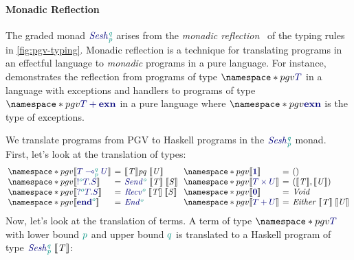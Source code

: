 \documentclass[sigplan,screen]{acmart}
\newcommand{\Conid}[1]{\mathit{#1}}
\newcommand{\Varid}[1]{\mathit{#1}}
\newcommand*\hsUnrestrictedArrow[3]{#1}
\newcommand*\hsLinearArrow[3]{#2\global\let\hsArrow=\hsUnrestrictedArrow}
\newcommand\hsPercent{%
  \global\let\hsOne=\hsOneAfterPercentCmd}
\newcommand*\hsOneAfterPercentCmd{%
  \global\let\hsOne=1
  \global\let\hsArrow=\hsLinearArrow}
\begin{document}
\paragraph{Monadic Reflection}
The graded monad \ensuremath{\seshtymon{\Varid{p}}{\Varid{q}}} arises from the \emph{monadic reflection}~\cite{filinski94} of the typing rules in \cref{fig:pgv-typing}. Monadic reflection is a technique for translating programs in an effectful language to \emph{monadic} programs in a pure language. For instance, \citet{filinski94} demonstrates the reflection from programs of type $\pgv{\ty{T}}$ in a language with exceptions and handlers to programs of type $\pgv{\ty{\tysum{T}{\mathbf{exn}}}}$ in a pure language where $\pgv{\ty{\mathbf{exn}}}$ is the type of exceptions.

We translate programs from PGV to Haskell programs in the \ensuremath{\seshtymon{\Varid{p}}{\Varid{q}}} monad. First, let's look at the translation of types:
\[
  \setlength{\arraycolsep}{2pt}
  \begin{array}{lcl}
    \pgv{\tosesh{\ty{\tylolli{p}{q}{T}{U}}}}
    &=
    &\ensuremath{\tosesh{\Conid{T}}\hsPercent \hsOne \hsArrow{\rightarrow }{\multimap }{\mathpunct{.}}\seshtymon{\Varid{p}}{\Varid{q}}\;\tosesh{\Conid{U}}}
    \\
    \pgv{\tosesh{\ty{\tysend[o]{T}{S}}}}
    &=
    &\ensuremath{\seshtysend[\cs{\Varid{o}}]\;\tosesh{\Conid{T}}\;\tosesh{\Conid{S}}}
    \\
    \pgv{\tosesh{\ty{\tyrecv[o]{T}{S}}}}
    &=
    &\ensuremath{\seshtyrecv[\cs{\Varid{o}}]\;\tosesh{\Conid{T}}\;\tosesh{\Conid{S}}}
    \\
    \pgv{\tosesh{\ty{\tyend[o]}}}
    &=
    &\ensuremath{\seshtyend[\cs{\Varid{o}}]}
  \end{array}
  \;
  \begin{array}{lcl}
    \pgv{\tosesh{\ty{\tyunit}}}
    &=
    &\ensuremath{()}
    \\
    \pgv{\tosesh{\ty{\typrod{T}{U}}}}
    &=
    &\ensuremath{(\tosesh{\Conid{T}},\tosesh{\Conid{U}})}
    \\
    \pgv{\tosesh{\ty{\tyvoid}}}
    &=
    &\ensuremath{\Conid{Void}}
    \\
    \pgv{\tosesh{\ty{\tysum{T}{U}}}}
    &=
    &\ensuremath{\Conid{Either}\;\tosesh{\Conid{T}}\;\tosesh{\Conid{U}}}
  \end{array}
\]
%
Now, let's look at the translation of terms. A term of type $\pgv{\ty{T}}$ with lower bound $\cs{p}$ and upper bound $\cs{q}$ is translated to a Haskell program of type \ensuremath{\seshtymon{\Varid{p}}{\Varid{q}}\;\tosesh{\Conid{T}}}:
\end{document}
